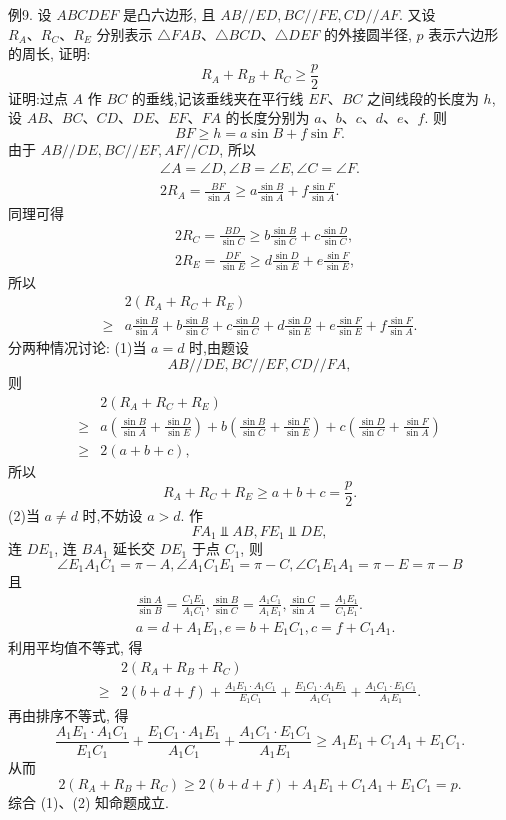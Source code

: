 例9. 设 $A B C D E F$ 是凸六边形, 且 $A B / / E D, B C / / F E, C D / / A F$. 又设 $R_A 、 R_C 、 R_E$ 分别表示 $\triangle F A B 、 \triangle B C D 、 \triangle D E F$ 的外接圆半径, $p$ 表示六边形的周长, 证明:
$$
R_A+R_B+R_C \geqslant \frac{p}{2}
$$
证明:过点 $A$ 作 $B C$ 的垂线,记该垂线夹在平行线 $E F 、 B C$ 之间线段的长度为 $h$, 设 $A B 、 B C 、 C D 、 D E 、 E F 、 F A$ 的长度分别为 $a 、 b 、 c 、 d 、 e 、 f$. 则
$$
B F \geqslant h=a \sin B+f \sin F .
$$
由于
$A B / / D E, B C / / E F, A F / / C D$,
所以
$$
\begin{gathered}
\angle A=\angle D, \angle B=\angle E, \angle C=\angle F . \\
2 R_A=\frac{B F}{\sin A} \geqslant a \frac{\sin B}{\sin A}+f \frac{\sin F}{\sin A} .
\end{gathered}
$$
同理可得
$$
\begin{aligned}
& 2 R_C=\frac{B D}{\sin C} \geqslant b \frac{\sin B}{\sin C}+c \frac{\sin D}{\sin C}, \\
& 2 R_E=\frac{D F}{\sin E} \geqslant d \frac{\sin D}{\sin E}+e \frac{\sin F}{\sin E},
\end{aligned}
$$
所以
$$
\begin{aligned}
& 2\left(R_A+R_C+R_E\right) \\
\geqslant & a \frac{\sin B}{\sin A}+b \frac{\sin B}{\sin C}+c \frac{\sin D}{\sin C}+d \frac{\sin D}{\sin E}+e \frac{\sin F}{\sin E}+f \frac{\sin F}{\sin A} .
\end{aligned}
$$
分两种情况讨论:
(1)当 $a=d$ 时,由题设
$$
A B / / D E, B C / / E F, C D / / F A,
$$
则
$$
\begin{aligned}
& 2\left(R_A+R_C+R_E\right) \\
\geqslant & a\left(\frac{\sin B}{\sin A}+\frac{\sin D}{\sin E}\right)+b\left(\frac{\sin B}{\sin C}+\frac{\sin F}{\sin E}\right)+c\left(\frac{\sin D}{\sin C}+\frac{\sin F}{\sin A}\right) \\
\geqslant & 2(a+b+c),
\end{aligned}
$$
所以
$$
R_A+R_C+R_E \geqslant a+b+c=\frac{p}{2} .
$$
(2)当 $a \neq d$ 时,不妨设 $a>d$. 作
$$
F A_1 \Perp A B, F E_1 \Perp D E,
$$
连 $D E_1$, 连 $B A_1$ 延长交 $D E_1$ 于点 $C_1$, 则
$$
\angle E_1 A_1 C_1=\pi-A, \angle A_1 C_1 E_1=\pi-C, \angle C_1 E_1 A_1=\pi-E=\pi-B
$$
且
$$
\begin{aligned}
& \frac{\sin A}{\sin B}=\frac{C_1 E_1}{A_1 C_1}, \frac{\sin B}{\sin C}=\frac{A_1 C_1}{A_1 E_1}, \frac{\sin C}{\sin A}=\frac{A_1 E_1}{C_1 E_1} . \\
& a=d+A_1 E_1, e=b+E_1 C_1, c=f+C_1 A_1 .
\end{aligned}
$$
利用平均值不等式, 得
$$
\begin{aligned}
& 2\left(R_A+R_B+R_C\right) \\
\geqslant & 2(b+d+f)+\frac{A_1 E_1 \cdot A_1 C_1}{E_1 C_1}+\frac{E_1 C_1 \cdot A_1 E_1}{A_1 C_1}+\frac{A_1 C_1 \cdot E_1 C_1}{A_1 E_1} .
\end{aligned}
$$
再由排序不等式, 得
$$
\frac{A_1 E_1 \cdot A_1 C_1}{E_1 C_1}+\frac{E_1 C_1 \cdot A_1 E_1}{A_1 C_1}+\frac{A_1 C_1 \cdot E_1 C_1}{A_1 E_1} \geqslant A_1 E_1+C_1 A_1+E_1 C_1 .
$$
从而
$$
2\left(R_A+R_B+R_C\right) \geqslant 2(b+d+f)+A_1 E_1+C_1 A_1+E_1 C_1=p .
$$
综合 (1)、(2) 知命题成立.


